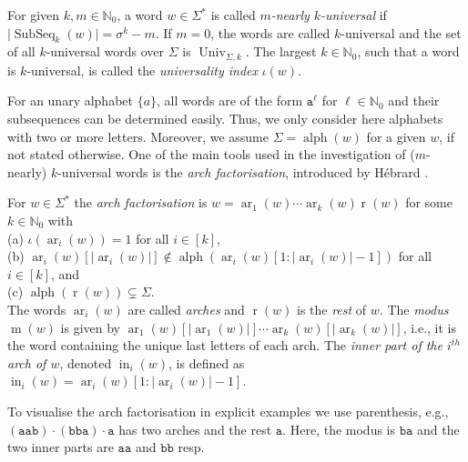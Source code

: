 \documentclass[runningheads,UKenglish,cleveref, autoref, thm-restate]{llncs}
\newcommand{\N}{\mathbb{N}}
\def\ta{\mathtt{a}}
\def\tb{\mathtt{b}}
\def\r{\operatorname{r}}
\def\m{\operatorname{m}}
\DeclareMathOperator{\ar}{ar}
\DeclareMathOperator\ScatFact{SubSeq}
\DeclareMathOperator{\letters}{alph}
\DeclareMathOperator{\NUniv}{NUniv}
\DeclareMathOperator{\Univ}{Univ}
\DeclareMathOperator{\inner}{in}
\begin{document}
\begin{definition}
	For given $k,m\in\N_0$, a word $w \in \Sigma^*$ is called \emph{$m$-nearly $k$-universal} if $\vert \ScatFact_k(w) \vert $$= 
	\sigma^k-m$. %
	If $m=0$, the words are called $k$-universal and the set of all $k$-universal words over $\Sigma$ is $\Univ_{\Sigma,k}$. The largest $k\in\N_0$, such that a word is $k$-universal, is called the {\em universality index} $\iota(w)$.
\end{definition}


For an unary alphabet $\{a\}$, all words are of the form $\ta^{\ell}$ for $\ell\in\N_0$ and their subsequences can be determined easily.  Thus, we only consider here alphabets with two or more letters. Moreover, we assume $\Sigma=\letters(w)$ 
for a given $w$, if not stated otherwise.
One of the main tools used in the investigation of ($m$-nearly) $k$-universal words is the \emph{arch factorisation}, introduced by Hébrard \cite{DBLP:journals/tcs/Hebrard91}. 

\begin{definition}
	For $w \in \Sigma^*$ the \emph{arch factorisation} is $w = \ar_1(w) \cdots \ar_k(w) \r(w)$ for some $k \in \mathbb{N}_0$ with\\
	(a) $\iota(\ar_i(w))=1$ for all $i \in [k]$, \\
	(b) $\ar_i(w)[\vert \ar_i(w) \vert] \notin \letters(\ar_i(w)[1 : \vert \ar_i(w) \vert - 1 ])$ for all $i \in [k]$, and\\
	(c) $\letters(\r(w)) \subsetneq \Sigma$.\\
	The words $\ar_i(w)$ are called \emph{arches} and $\r(w)$ is the \emph{rest} of $w$.
	The {\em modus} $\m(w)$ is given by  $\ar_1(w)[\vert\ar_1(w)\vert] \cdots\ar_k(w)[\vert\ar_k(w)\vert]$, i.e., it is the word containing the unique last letters of each arch.
	The \emph{inner part of the $i^{th}$ arch of $w$}, denoted $\inner_i(w)$, is defined as $ \inner_i(w) = \ar_i(w)[1 : \vert \ar_i(w) \vert - 1 ]$.
\end{definition}

To visualise the arch factorisation in explicit examples we use parenthesis, e.g.,  $(\mathtt{aab})\cdot (\mathtt{bba}) \cdot \ta$ has two arches and the rest $\ta$. Here, the modus is $\tb\ta$ and the two inner parts are $\ta\ta$ and $\tb\tb$ resp.
\end{document}
